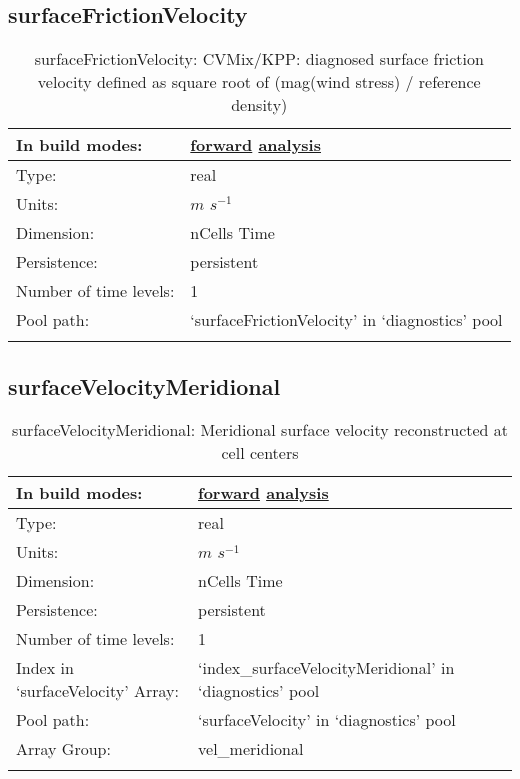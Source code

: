 \subsection[surfaceFrictionVelocity]{surfaceFrictionVelocity}
\label{subsec:var_sec_diagnostics_surfaceFrictionVelocity}
\begin{center}
\begin{longtable}{| p{2.0in} | p{4.0in} |}
        \hline 
        In build modes: & \hyperref[subsec:forward_var_tab_diagnostics]{forward} \hyperref[subsec:analysis_var_tab_diagnostics]{analysis} \\
        \hline 
        Type: & real \\
        \hline 
        Units: & $m$ $s^{-1}$ \\
        \hline 
        Dimension: & nCells Time \\
        \hline 
        Persistence: & persistent \\
        \hline 
        Number of time levels: & 1 \\
        \hline 
            Pool path: & `surfaceFrictionVelocity' in `diagnostics' pool \\
		 \hline 
    \caption{surfaceFrictionVelocity: CVMix/KPP: diagnosed surface friction velocity defined as square root of (mag(wind stress) / reference density)}
\end{longtable}
\end{center}
\subsection[surfaceVelocityMeridional]{surfaceVelocityMeridional}
\label{subsec:var_sec_diagnostics_surfaceVelocityMeridional}
\begin{center}
\begin{longtable}{| p{2.0in} | p{4.0in} |}
        \hline 
        In build modes: & \hyperref[subsec:forward_var_tab_diagnostics]{forward} \hyperref[subsec:analysis_var_tab_diagnostics]{analysis} \\
        \hline 
        Type: & real \\
        \hline 
        Units: & $m$ $s^{-1}$ \\
        \hline 
        Dimension: & nCells Time \\
        \hline 
        Persistence: & persistent \\
        \hline 
        Number of time levels: & 1 \\
        \hline 
		 Index in `surfaceVelocity' Array: & `index\_surfaceVelocityMeridional' in `diagnostics' pool \\
		 \hline 
            Pool path: & `surfaceVelocity' in `diagnostics' pool \\
		 \hline 
		 Array Group: & vel\_meridional \\
		 \hline 
    \caption{surfaceVelocityMeridional: Meridional surface velocity reconstructed at cell centers}
\end{longtable}
\end{center}
